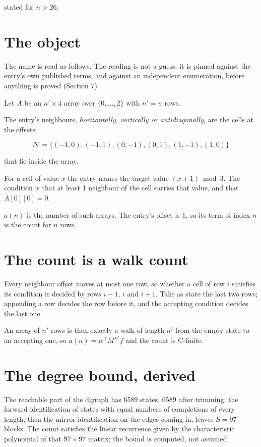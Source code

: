 \documentclass[11pt]{article}
\theoremstyle{definition}
\begin{document}
stated for $n > 26$.

\section{The object}

The name is read as follows. The reading is not a guess: it is pinned against the entry's own published terms, and against an independent enumeration, before anything is proved (Section 7).

Let $A$ be an $n' \times 4$ array over $\{0,\dots,2\}$ with $n' = n$ rows.

The entry's neighbours, {\itshape horizontally, vertically or antidiagonally}, are the cells at the offsets

\[\mathcal{N} = \{(-1,0), (-1,1), (0,-1), (0,1), (1,-1), (1,0)\}\]

that lie inside the array.

For a cell of value $x$ the entry names the target value $(x + 1) \bmod 3$. The condition is that at least 1 neighbour of the cell carries that value, and that $A[0][0] = 0$.

$a(n)$ is the number of such arrays. The entry's offset is 1, so its term of index $n$ is the count for $n$ rows.

\section{The count is a walk count}

Every neighbour offset moves at most one row, so whether a cell of row $i$ satisfies its condition is decided by rows $i-1$, $i$ and $i+1$. Take as state the last two rows; appending a row decides the row before it, and the accepting condition decides the last one.

An array of $n'$ rows is then exactly a walk of length $n'$ from the empty state to an accepting one, so $a(n) = w^{\mathsf T}M^{\,n'}f$ and the count is C-finite.

\section{The degree bound, derived}

The reachable part of the digraph has $6589$ states, $6589$ after trimming; the forward identification of states with equal numbers of completions of every length, then the mirror identification on the edges coming in, leaves $S = 97$ blocks. The count satisfies the linear recurrence given by the characteristic polynomial of that $97\times97$ matrix; the bound is computed, not assumed.
\end{document}
